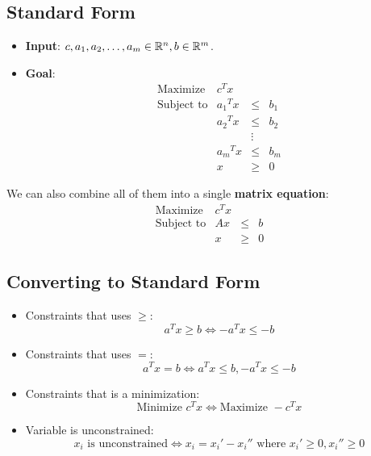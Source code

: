 \subsection{Standard Form}

\begin{itemize}
    \item \textbf{Input}: $c, a_1, a_2, \dots, a_m \in \mathbb{R}^n, b \in \mathbb{R}^m$.
    \item \textbf{Goal}: \[ \begin{matrix}
                  \text{Maximize}   & c^Tx      &        &     \\
                  \text{Subject to} & {a_1}^T x & \le    & b_1 \\
                                    & {a_2}^T x & \le    & b_2 \\
                                    &           & \vdots &     \\
                                    & {a_m}^T x & \le    & b_m \\
                                    & x         & \ge    & 0
              \end{matrix} \]
\end{itemize}

We can also combine all of them into a single \textbf{matrix equation}: \[ \begin{matrix}
    \text{Maximize}   & c^Tx &     &   \\
    \text{Subject to} & Ax   & \le & b \\
                      & x    & \ge & 0
\end{matrix} \]

\subsection{Converting to Standard Form}

\begin{itemize}
    \item Constraints that uses $\geq$: \[
        a^Tx \geq b \iff -a^Tx \leq -b
    \]

    \item Constraints that uses $=$: \[
        a^Tx = b \iff a^Tx \leq b, -a^Tx \leq -b
    \]

    \item Constraints that is a minimization: \[
        \text{Minimize } c^Tx \iff \text{Maximize } -c^Tx
    \]

    \item Variable is unconstrained: \[
        x_i \text{ is unconstrained} \iff x_i = x_i' - x_i'' \text{ where } x_i' \geq 0, x_i'' \geq 0
    \]
\end{itemize}

